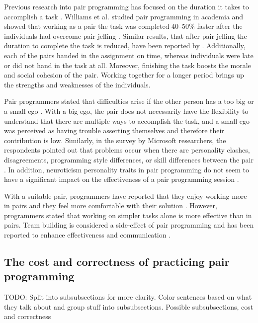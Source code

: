 \documentclass[conference]{IEEEtran}
\newcommand{\todo}[1]{{\color{red} TODO: {#1}}}
\begin{document}
Previous research into pair programming has focused on the duration it takes to accomplish a task \cite{10.1145/2652524.2652529, Williams2000Strengthening, Hannay2009effectiveness}. Williams et al. studied pair programming in academia and showed that working as a pair the task was completed 40--50\% faster after the individuals had overcome pair jelling \cite{Williams2000Strengthening}. Similar results, that after pair jelling the duration to complete the task is reduced, have been reported by \cite{1541842}. Additionally, each of the pairs handed in the assignment on time, whereas individuals were late or did not hand in the task at all. Moreover, finishing the task boosts the morale and social cohesion of the pair. Working together for a longer period brings up the strengths and weaknesses of the individuals.

Pair programmers stated that difficulties arise if the other person has a too big or a small ego \cite{Williams2000Strengthening}. With a big ego, the pair does not necessarily have the flexibility to understand that there are multiple ways to accomplish the task, and a small ego was perceived as having trouble asserting themselves and therefore their contribution is low. Similarly, in the survey by Microsoft researchers, the respondents pointed out that problems occur when there are personality clashes, disagreements, programming style differences, or skill differences between the pair \cite{10.1145/1414004.1414026}. In addition, neuroticism personality traits in pair programming do not seem to have a significant impact on the effectiveness of a pair programming session \cite{10.1145/1852786.1852816}.

With a suitable pair, programmers have reported that they enjoy working more in pairs and they feel more comfortable with their solution \cite{Williams2000Strengthening}. However, programmers stated that working on simpler tasks alone is more effective than in pairs. Team building is considered a side-effect of pair programming and has been reported to enhance effectiveness and communication \cite{10.5555/377517.377531}. 


\subsection{The cost and correctness of practicing pair programming}

\todo{Split into subsubsections for more clarity. Color sentences based on what they talk about and group stuff into subsubsections. Possible subsubsections, cost and correctness}
\end{document}
